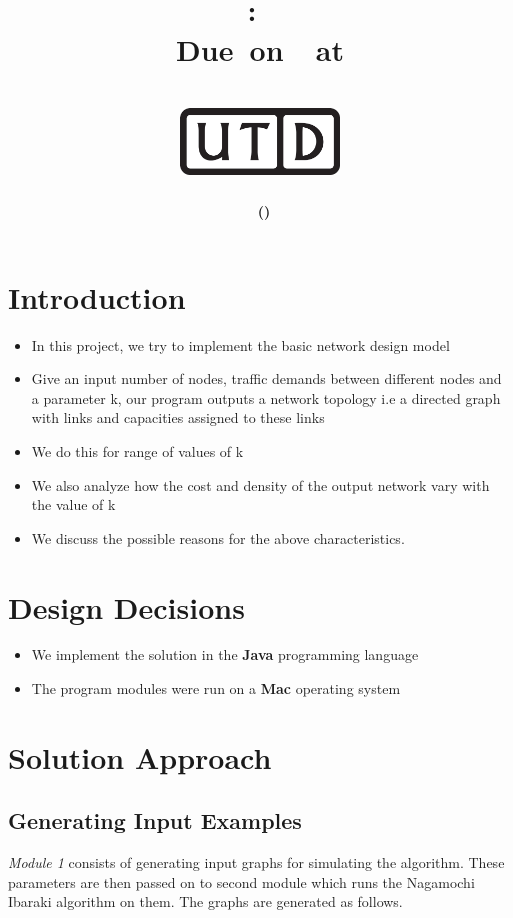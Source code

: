 \documentclass[12pt,letterpaper,titlepage,en-US]{article}
\title{
    \vspace{1in}
    \textmd{\textbf{\hmwkClassName \\\hmwkClass:\ \hmwkTitle }}\\
    \normalsize\vspace{0.1in}\small{Due\ on\ \DTMusedate{DueDate}\ at \DTMusetime{DueDate} }\\
    \vspace{0.1in}\large{\textit{\hmwkClassInstructor}}\\
    \vspace{0.5in}\includegraphics[height=2.4em]{UTD_logo_BW}\\
    \vspace{2in}
}
\author{\textbf{\hmwkAuthorName\ \footnotesize{(\hmwkAuthorNetID)}} \\ }
\date{}
\begin{document}
\maketitle
{}

\tableofcontents

\pagebreak
{}

\section{Introduction}
\begin{itemize}
\item In this project, we try to implement the basic network design model
\item Give an input number of nodes, traffic demands between different nodes and a parameter k, our program outputs a network topology i.e a directed graph with links and capacities assigned to these links
\item We do this for range of values of k
\item  We also analyze how the cost and density of the output network vary with the value of k
\item We discuss the possible reasons for the above characteristics.
\end{itemize}

\section{Design Decisions}
\begin{itemize}
\item We implement the solution in the \textbf{Java} programming language
\item The program modules were run on a \textbf{Mac} operating system

\end{itemize}





\section{Solution Approach}

\subsection{Generating Input Examples}
\textit{Module 1} consists of generating input graphs for simulating the algorithm.
These parameters are then passed on to second module which runs the Nagamochi Ibaraki  algorithm on them. The graphs are generated as follows.
\end{document}
